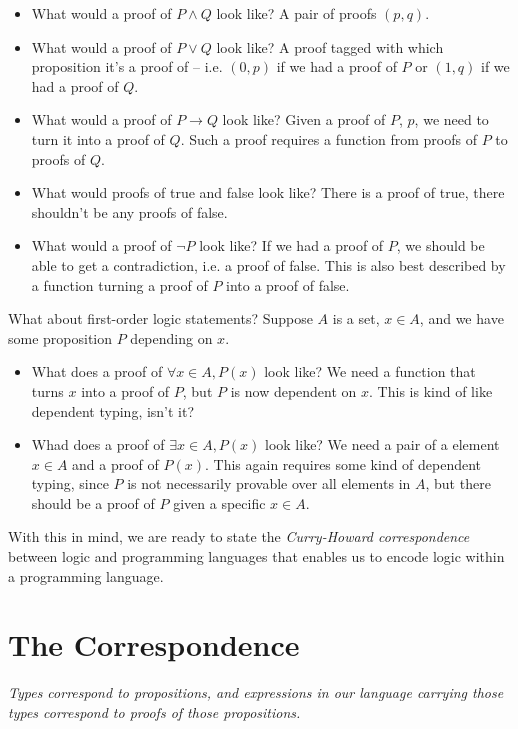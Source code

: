 \documentclass[12pt, nodate]{scrartcl}
\begin{document}
\begin{itemize}
  \item What would a proof of $P \wedge Q$ look like? A pair of proofs $(p, q)$. 
  \item What would a proof of $P \vee Q$ look like? A proof tagged with which
    proposition it's a proof of -- i.e. $(0, p)$ if we had a proof of $P$ or
    $(1, q)$ if we had a proof of $Q$.
  \item What would a proof of $P \to Q$ look like? Given a proof of $P$, $p$, we
    need to turn it into a proof of $Q$. Such a proof requires a function from
    proofs of $P$ to proofs of $Q$. 
  \item What would proofs of true and false look like? There is a proof of true,
    there shouldn't be any proofs of false. 
  \item What would a proof of $\neg P$ look like? If we had a proof of $P$, we
    should be able to get a contradiction, i.e. a proof of false. This is also
    best described by a function turning a proof of $P$ into a proof of false. 
\end{itemize}

What about first-order logic statements? Suppose $A$ is a set, $x \in A$, and
we have some proposition $P$ depending on $x$. 
\begin{itemize}
  \item What does a proof of $\forall x \in A, P(x)$ look like? We need a function
    that turns $x$ into a proof of $P$, but $P$ is now dependent on $x$. This is
    kind of like dependent typing, isn't it? 
  \item Whad does a proof of $\exists x \in A, P(x)$ look like? We need a pair
    of a element $x \in A$ and a proof of $P(x)$. This again requires some kind
    of dependent typing, since $P$ is not necessarily provable over all elements
    in $A$, but there should be a proof of $P$ given a specific $x \in A$. 
\end{itemize}
With this in mind, we are ready to state the \emph{Curry-Howard correspondence}
between logic and programming languages that enables us to encode logic within a
programming language. 

\section{The Correspondence}
\begin{center}
  \emph{Types correspond to propositions, and expressions in our language
    carrying those types
  correspond to proofs of those propositions.}
\end{center}
\end{document}
